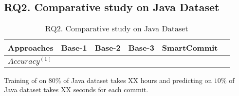 \subsection{RQ2. Comparative study on Java Dataset}

\begin{table}[t]
	\caption{RQ2. Comparative study on Java Dataset}
	\vspace{-0.1in}
	\begin{center}
		\footnotesize
		\tabcolsep 4pt
		\renewcommand{\arraystretch}{1} \begin{tabular}{p{1.4cm}<{\centering}|p{0.7cm}<{\centering}p{0.7cm}<{\centering}p{0.7cm}<{\centering}p{1.5cm}<{\centering}|p{0.7cm}<{\centering}}
			
			\hline
			Approaches          & Base-1 & Base-2 & Base-3 & SmartCommit & \tool\\
			\hline
			$Accuracy^{(1)}$   &                &			 	&				   &		&      \\
			\hline
		\end{tabular}
		\label{RQ2-result}
	\end{center}
\end{table}





Training of \tool on $80\%$ of Java dataset takes XX hours and predicting on $10\%$ of Java dataset takes XX seconds for each commit.